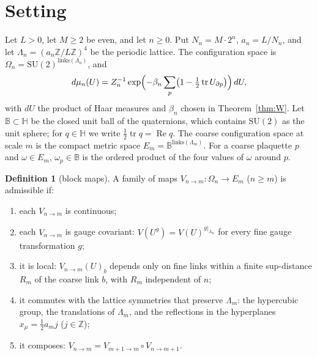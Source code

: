 \documentclass[11pt,a4paper]{article}
\theoremstyle{definition}
\newtheorem{definition}[theorem]{Definition}
\theoremstyle{remark}
\newcommand{\B}{\mathbb{B}}
\newcommand{\Hq}{\mathbb{H}}
\begin{document}
\section{Setting}\label{sec:setting}

Let $L>0$, let $M\ge2$ be even, and let $n\ge0$. Put $N_n=M\cdot2^n$, $a_n=L/N_n$, and let $\Lambda_n=(a_n\mathbb Z/L\mathbb Z)^4$ be the periodic lattice. The configuration space is $\Omega_n=\mathrm{SU}(2)^{\text{links}(\Lambda_n)}$, and
\[
d\mu_n(U)=Z_n^{-1}\exp\Bigl(-\beta_n\sum_p\bigl(1-\tfrac12\operatorname{tr}U_{\partial p}\bigr)\Bigr)\,dU,
\]
with $dU$ the product of Haar measures and $\beta_n$ chosen in Theorem~\ref{thm:W}. Let $\B\subset\Hq$ be the closed unit ball of the quaternions, which contains $\mathrm{SU}(2)$ as the unit sphere; for $q\in\Hq$ we write $\tfrac12\operatorname{tr}q=\operatorname{Re}q$. The coarse configuration space at scale $m$ is the compact metric space $E_m=\B^{\text{links}(\Lambda_m)}$. For a coarse plaquette $p$ and $\omega\in E_m$, $\omega_p\in\B$ is the ordered product of the four values of $\omega$ around $p$.

\begin{definition}[block maps]\label{def:block}
A family of maps $V_{n\to m}\colon\Omega_n\to E_m$ ($n\ge m$) is admissible if:
\begin{enumerate}[label=(B\arabic*),leftmargin=3em]
\item each $V_{n\to m}$ is continuous;
\item each $V_{n\to m}$ is gauge covariant: $V(U^g)=V(U)^{g|_{\Lambda_m}}$ for every fine gauge transformation $g$;
\item it is local: $V_{n\to m}(U)_b$ depends only on fine links within a finite sup-distance $R_m$ of the coarse link $b$, with $R_m$ independent of $n$;
\item it commutes with the lattice symmetries that preserve $\Lambda_m$: the hypercubic group, the translations of $\Lambda_m$, and the reflections in the hyperplanes $x_\mu=\tfrac12a_mj$ ($j\in\mathbb Z$);
\item it composes: $V_{n\to m}=V_{m+1\to m}\circ V_{n\to m+1}$.
\end{enumerate}
\end{definition}
\end{document}
